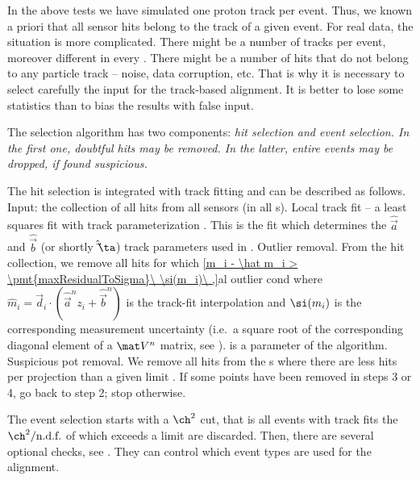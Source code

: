 In the above  tests we have simulated one proton track per event. Thus, we known a priori that all sensor hits belong to the track of a given event. For real  data, the situation is more complicated. There might be a number of tracks per event, moreover different in every . There might be a number of hits that do not belong to any particle track -- noise, data corruption, etc. That is why it is necessary to select carefully the input for the track-based alignment. It is better to lose some statistics than to bias the results with false input.

The selection algorithm has two components: \em{hit selection} and \em{event selection}. In the first one, doubtful hits may be removed. In the latter, entire events may be dropped, if found suspicious.

The hit selection is integrated with track fitting and can be described as follows.
\bitm
\itm Input: the collection of all hits from all sensors (in all s).
\itm Local track fit -- a least squares fit with track parameterization . This is the fit which determines the $\hat\vec a$ and $\hat\vec b$ (or shortly $\hat\vec\ta$) track parameters used in .
\itm Outlier removal. From the hit collection, we remove all hits for which
\eqref{m_i - \hat m_i > \pmt{maxResidualToSigma}\ \si(m_i)\ ,}{al outlier cond}
where $\hat m_i = \vec d_i \cdot (\hat\vec a^n z_i + \hat\vec b^n)$ is the track-fit interpolation and $\si(m_i)$ is the corresponding measurement uncertainty (i.e.~a square root of the corresponding diagonal element of a $\mat V^n$ matrix, see ).  is a parameter of the algorithm.
\itm Suspicious pot removal. We remove all hits from the s where there are less hits per projection than a given limit .
\itm If some points have been removed in steps 3 or 4, go back to step 2; stop otherwise.
\eitm

The event selection starts with a $\ch^2$ cut, that is all events with track fits the $\ch^2/\hbox{n.d.f.}$ of which exceeds a limit  are discarded. Then, there are several optional checks, see . They can control which event types are used for the alignment.


